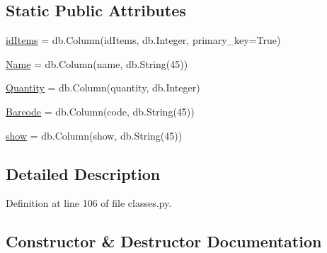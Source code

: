 \subsection*{Static Public Attributes}
\begin{DoxyCompactItemize}
\item 
\hyperlink{class_web_content_1_1classes_1_1job_gear_a3c06d5a64cb18ce600a7e015d7ad7e2e}{id\+Items} = db.\+Column(\textquotesingle{}id\+Items\textquotesingle{}, db.\+Integer, primary\+\_\+key=True)
\item 
\hyperlink{class_web_content_1_1classes_1_1job_gear_ac24ca34d6bcaedda98f1711e0733c8ed}{Name} = db.\+Column(\textquotesingle{}name\textquotesingle{}, db.\+String(45))
\item 
\hyperlink{class_web_content_1_1classes_1_1job_gear_ad4f9a871b8c10bcdc1e3921b313620ca}{Quantity} = db.\+Column(\textquotesingle{}quantity\textquotesingle{}, db.\+Integer)
\item 
\hyperlink{class_web_content_1_1classes_1_1job_gear_aa99b6c99df4ef2686d9a7ae05839e870}{Barcode} = db.\+Column(\textquotesingle{}code\textquotesingle{}, db.\+String(45))
\item 
\hyperlink{class_web_content_1_1classes_1_1job_gear_ac60ca08b7517caefae54fd99e8c2f854}{show} = db.\+Column(\textquotesingle{}show\textquotesingle{}, db.\+String(45))
\end{DoxyCompactItemize}


\subsection{Detailed Description}


Definition at line 106 of file classes.\+py.



\subsection{Constructor \& Destructor Documentation}
\mbox{\label{class_web_content_1_1classes_1_1job_gear_a65e8cf098ecea70db55ad9bd0a3639e2}} 
